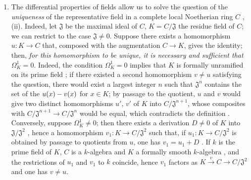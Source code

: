 \begin{remarks}[21.5.3]
\label{0.21.5.3}
\begin{enumerate}
  \item[(i)] The differential properties of fields allow us to solve the question of the \emph{uniqueness} of the representative field in a complete local Noetherian ring $C$ , (ii).
    Indeed, let $\mathfrak{J}$ be the maximal ideal of $C$, $K=C/\mathfrak{J}$ the residue field of $C$; we can restrict to the case $\mathfrak{J}\neq 0$.
    Suppose there exists a homomorphism $u:K\to C$ that, composed with the augmentation $C\to K$, gives the identity; then, \emph{for this homomorphism to be unique, it is necessary and sufficient that} $\Omega^1_K=0$.
    Indeed, the condition $\Omega^1_K=0$ implies that $K$ is formally unramified on its prime field ; if there existed a second homomorphism $v\neq u$ satisfying the question, there would exist a largest integer $n$ such that $\mathfrak{J}^n$ contains the set of the $u(x)- v(x)$ for $x\in K$; by passage to the quotient, $u$ and $v$ would give two distinct homomorphisms $u'$, $v'$ of $K$ into $C/\mathfrak{J}^{n+1}$, whose composites with $C/\mathfrak{J}^{n+1}\to C/\mathfrak{J}^n$ would be equal, which contradicts the definition .
    Conversely, suppose $\Omega^1_K\neq 0$; then there exists a derivation $D\neq 0$ of $K$ into $\mathfrak{J}/\mathfrak{J}^2$ , hence a homomorphism $v_1:K\to C/\mathfrak{J}^2$ such that, if $u_1:K\to C/\mathfrak{J}^2$ is obtained by passage to quotients from $u$, one has $v_1=u_1+D$ .
    If $k$ is the prime field of $K$, $C$ is a $k$-algebra and $K$ a formally smooth $k$-algebra , and the restrictions of $u_1$ and $v_1$ to $k$ coincide, hence $v_1$ factors as $K\xrightarrow{v} C\to C/\mathfrak{J}^2$ and one has $v\neq u$.


\end{enumerate}
\end{remarks}
